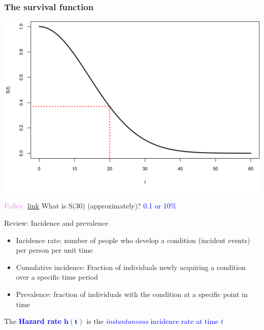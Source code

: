 \documentclass[10pt,t]{beamer}
\begin{document}
\begin{frame}
	\frametitle{The survival function}
	\includegraphics[height=0.8\textheight]{figs/survival_function.png}
	
	\textcolor{violet}{Pollev: \href{https://PollEv.com/free_text_polls/ncQUzw9d03Fbh7KIocDCw/respond}{link}} What is S(30) (approximately)? \pause \textcolor{blue}{0.1 or 10\%}
	
\end{frame}

\begin{frame}{Review: Incidence and prevalence}
	\begin{itemize}
		\item Incidence rate: number of people who develop a condition (incident events) per person per unit time
		
		\medskip
		
		\item Cumulative incidence: Fraction of individuals newly acquiring a condition over a specific time period
		
		\medskip
		
		\item Prevalence: fraction of individuals with the condition at a specific point in time
	\end{itemize}
\bigskip

	The \textcolor{blue}{\textbf{Hazard rate} $\mathbf{h(t)}$} is the \textcolor{blue}{\textit{instantaneous} incidence rate at time $t$}
\end{frame}
\end{document}
